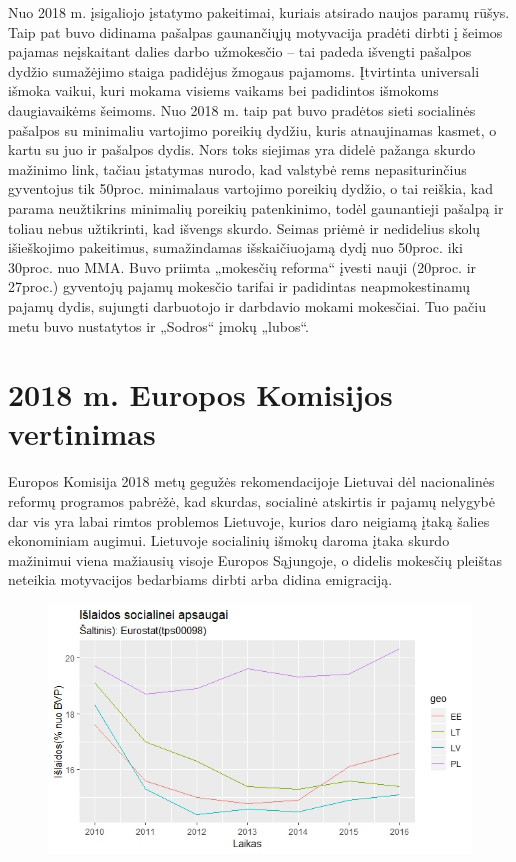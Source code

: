 \documentclass[12pt,titlepage]{article}
\begin{document}
\justify
\hspace{\parindent} 
Nuo 2018 m. įsigaliojo įstatymo pakeitimai, kuriais atsirado naujos paramų rūšys. Taip pat buvo didinama pašalpas gaunančiųjų motyvacija pradėti dirbti į šeimos pajamas neįskaitant dalies darbo užmokesčio – tai padeda išvengti pašalpos dydžio sumažėjimo staiga padidėjus žmogaus pajamoms. Įtvirtinta universali išmoka vaikui, kuri mokama visiems vaikams bei padidintos išmokoms daugiavaikėms šeimoms. Nuo 2018 m. taip pat buvo pradėtos sieti socialinės pašalpos su minimaliu vartojimo poreikių dydžiu, kuris atnaujinamas kasmet, o kartu su juo ir pašalpos dydis. Nors toks siejimas yra didelė pažanga skurdo mažinimo link, tačiau įstatymas nurodo, kad valstybė rems nepasiturinčius gyventojus tik 50proc. minimalaus vartojimo poreikių dydžio, o tai reiškia, kad parama neužtikrins minimalių poreikių patenkinimo, todėl gaunantieji pašalpą ir toliau nebus užtikrinti, kad išvengs skurdo. Seimas priėmė ir nedidelius skolų išieškojimo pakeitimus, sumažindamas išskaičiuojamą dydį nuo 50proc. iki 30proc. nuo MMA. Buvo priimta „mokesčių reforma“ įvesti nauji (20proc. ir 27proc.) gyventojų pajamų mokesčio tarifai ir padidintas neapmokestinamų pajamų dydis, sujungti darbuotojo ir darbdavio mokami mokesčiai. Tuo pačiu metu buvo nustatytos ir „Sodros“ įmokų „lubos“.

\justify

\section{2018 m. Europos Komisijos vertinimas}
\justify
\hspace{\parindent}
Europos Komisija 2018 metų gegužės rekomendacijoje Lietuvai dėl nacionalinės reformų programos pabrėžė, kad skurdas, socialinė atskirtis ir pajamų nelygybė dar vis yra labai rimtos problemos Lietuvoje, kurios daro neigiamą įtaką šalies ekonominiam augimui. Lietuvoje socialinių išmokų daroma įtaka skurdo mažinimui viena mažiausių visoje Europos Sąjungoje, o didelis mokesčių pleištas neteikia motyvacijos bedarbiams dirbti arba didina emigraciją.

\begin{figure}[H]
\center
\includegraphics[scale=0.8]{Rplot01}
\end{figure}
\end{document}
